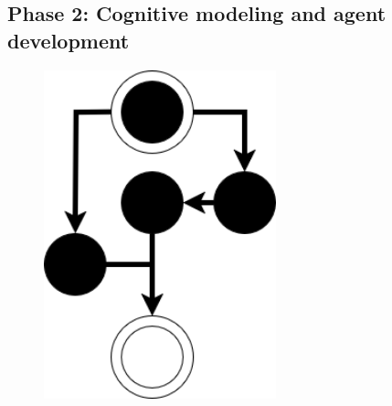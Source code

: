 \documentclass[12pt,a4paper]{article} %
\begin{document}
	\subsection{Phase 2: Cognitive modeling and agent development}

	\begin{figure}[h!]
		\centering
		\begin{minipage}[b]{0.3\textwidth}
			\centering
		\end{minipage}
		\begin{minipage}[b]{0.3\textwidth}
			\centering
			\includegraphics[width=0.6\textwidth]{images/workflow_icon.png}

\end{minipage}
\end{figure}
\end{document}
